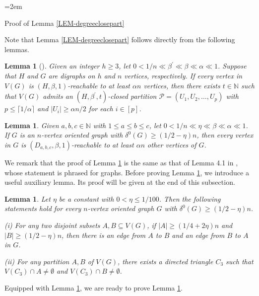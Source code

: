\documentclass[11pt,a4paper,reqno]{amsart}
\makeatletter
\renewcommand\subsection{\@startsection{subsection}{2}%
  \z@{-1\linespacing\@plus-.7\linespacing}{1\linespacing}%
  {\normalfont\large\bfseries\raggedright\hangindent=2em  \hangafter=1}}
\newtheorem{lemma}[theorem]{Lemma}
\theoremstyle{definition} %
\makeatother
\begin{document}
\subsection{Proof of Lemma \ref{LEM-degreeclosepart}}

Note that Lemma \ref{LEM-degreeclosepart} follows directly from the following lemmas.

\begin{lemma}[\cite{hanRSA64}]\label{LEM-closed-partition}
Given an integer $h\geqslant 3$, let $0<1/n \ll \beta^\prime \ll \beta \ll \alpha \ll 1$. Suppose that $H$ and $G$ are digraphs on $h$ and $n$ vertices, respectively. If every vertex in $V(G)$ is $(H,\beta,1)$-reachable to at least $\alpha n$ vertices, then there exists $t\in\mathbb{N}$ such that $V(G)$ admits an $(H,\beta^\prime,t)$-closed partition $\mathcal{P}=(U_1,U_2,\ldots,U_p)$ with $p\leqslant \lceil 1/\alpha\rceil$ and $|U_i|\geqslant \alpha n/2$ for each $i\in [p]$.
\end{lemma}

\begin{lemma} \label{LEM:Dabcs-contain-v and reachable}
Given $a,b,c\in \mathbb{N}$ with $1\leqslant a\leqslant b\leqslant c$, let $0<1/n\ll \eta\ll \beta \ll \alpha \ll 1$. 
If $G$ is an $n$-vertex oriented graph with $\delta^0(G)\geqslant (1/2-\eta)n$, then every vertex in $G$ is $(D_{a,b,c},\beta,1)$-reachable to at least $\alpha n$ other vertices of $G$.
\end{lemma}
We remark that the proof of Lemma \ref{LEM-closed-partition} is the same as that of Lemma 4.1 in \cite{hanRSA64}, whose statement is phrased for graphs. Before proving Lemma \ref{LEM:Dabcs-contain-v and reachable}, we introduce a useful auxiliary lemma. Its proof will be given at the end of this subsection.

\begin{lemma}\label{LEM:cross-edge-triangle}
    Let $\eta$ be a constant with $0<\eta\leqslant 1/100$. Then the following statements hold for every $n$-vertex oriented graph $G$ with $\delta^0(G)\geqslant (1/2-\eta)n$. 

   (i)  For any two disjoint subsets $A,B\subseteq V(G)$, if $|A|\geqslant (1/4+2\eta)n$ and $|B|\geqslant (1/2-\eta)n$, then there is an edge from $A$ to $B$ and an edge from $B$ to $A$ in $G$.
   
   (ii) For any partition $A,B$ of $V(G)$, there exists a directed triangle  $C_3$ such that $V(C_3)\cap A\neq \emptyset$ and $V(C_3)\cap B\neq \emptyset$.
\end{lemma}
Equipped with Lemma \ref{LEM:cross-edge-triangle}, we are ready to prove Lemma \ref{LEM:Dabcs-contain-v and reachable}.
\end{document}
